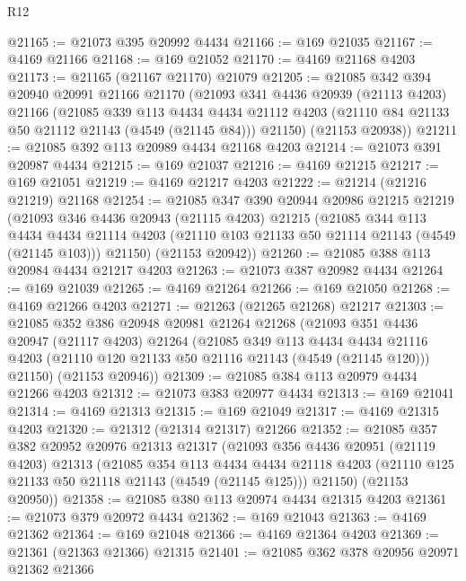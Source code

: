 \begin{lexlean}{R12}
\begin{coremodule}
@21165 := @21073 @395 @20992 @4434
@21166 := @169 @21035
@21167 := @4169 @21166
@21168 := @169 @21052
@21170 := @4169 @21168 @4203
@21173 := @21165 (@21167 @21170) @21079
@21205 := @21085
    @342
    @394
    @20940
    @20991
    @21166
    @21170
    (@21093
      @341
      @4436
      @20939
      (@21113 @4203)
      @21166
      (@21085
        @339
        @113
        @4434
        @4434
        @21112
        @4203
        (@21110 @84 @21133 @50 @21112 @21143 (@4549 (@21145 @84)))
        @21150)
      (@21153 @20938))
@21211 := @21085 @392 @113 @20989 @4434 @21168 @4203
@21214 := @21073 @391 @20987 @4434
@21215 := @169 @21037
@21216 := @4169 @21215
@21217 := @169 @21051
@21219 := @4169 @21217 @4203
@21222 := @21214 (@21216 @21219) @21168
@21254 := @21085
    @347
    @390
    @20944
    @20986
    @21215
    @21219
    (@21093
      @346
      @4436
      @20943
      (@21115 @4203)
      @21215
      (@21085
        @344
        @113
        @4434
        @4434
        @21114
        @4203
        (@21110 @103 @21133 @50 @21114 @21143 (@4549 (@21145 @103)))
        @21150)
      (@21153 @20942))
@21260 := @21085 @388 @113 @20984 @4434 @21217 @4203
@21263 := @21073 @387 @20982 @4434
@21264 := @169 @21039
@21265 := @4169 @21264
@21266 := @169 @21050
@21268 := @4169 @21266 @4203
@21271 := @21263 (@21265 @21268) @21217
@21303 := @21085
    @352
    @386
    @20948
    @20981
    @21264
    @21268
    (@21093
      @351
      @4436
      @20947
      (@21117 @4203)
      @21264
      (@21085
        @349
        @113
        @4434
        @4434
        @21116
        @4203
        (@21110 @120 @21133 @50 @21116 @21143 (@4549 (@21145 @120)))
        @21150)
      (@21153 @20946))
@21309 := @21085 @384 @113 @20979 @4434 @21266 @4203
@21312 := @21073 @383 @20977 @4434
@21313 := @169 @21041
@21314 := @4169 @21313
@21315 := @169 @21049
@21317 := @4169 @21315 @4203
@21320 := @21312 (@21314 @21317) @21266
@21352 := @21085
    @357
    @382
    @20952
    @20976
    @21313
    @21317
    (@21093
      @356
      @4436
      @20951
      (@21119 @4203)
      @21313
      (@21085
        @354
        @113
        @4434
        @4434
        @21118
        @4203
        (@21110 @125 @21133 @50 @21118 @21143 (@4549 (@21145 @125)))
        @21150)
      (@21153 @20950))
@21358 := @21085 @380 @113 @20974 @4434 @21315 @4203
@21361 := @21073 @379 @20972 @4434
@21362 := @169 @21043
@21363 := @4169 @21362
@21364 := @169 @21048
@21366 := @4169 @21364 @4203
@21369 := @21361 (@21363 @21366) @21315
@21401 := @21085
    @362
    @378
    @20956
    @20971
    @21362
    @21366

\end{coremodule}
\end{lexlean}
